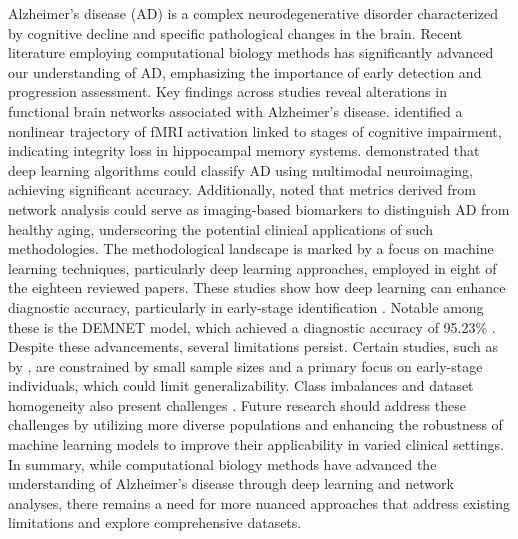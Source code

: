 \documentclass{MITcsail}
\begin{document}
Alzheimer's disease (AD) is a complex neurodegenerative disorder characterized by cognitive decline and specific pathological changes in the brain. Recent literature employing computational biology methods has significantly advanced our understanding of AD, emphasizing the importance of early detection and progression assessment. Key findings across studies reveal alterations in functional brain networks associated with Alzheimer's disease. \citet{ref_10_1523_jneurosci_2250_06_2006} identified a nonlinear trajectory of fMRI activation linked to stages of cognitive impairment, indicating integrity loss in hippocampal memory systems. \citet{ref_10_3389_fnagi_2019_00220} demonstrated that deep learning algorithms could classify AD using multimodal neuroimaging, achieving significant accuracy. Additionally, \citet{ref_10_1371_journal_pcbi_1000100} noted that metrics derived from network analysis could serve as imaging-based biomarkers to distinguish AD from healthy aging, underscoring the potential clinical applications of such methodologies. The methodological landscape is marked by a focus on machine learning techniques, particularly deep learning approaches, employed in eight of the eighteen reviewed papers. These studies show how deep learning can enhance diagnostic accuracy, particularly in early-stage identification \citep{ref_10_1109_isbi_2014_6868045,ref_10_1109_access_2021_3090474}. Notable among these is the DEMNET model, which achieved a diagnostic accuracy of 95.23\% \citep{ref_10_1109_access_2021_3090474}. Despite these advancements, several limitations persist. Certain studies, such as by \citet{ref_10_1523_jneurosci_2250_06_2006}, are constrained by small sample sizes and a primary focus on early-stage individuals, which could limit generalizability. Class imbalances and dataset homogeneity also present challenges \citep{ref_10_1186_1471_2202_10_101,ref_10_1002_alz_13390}. Future research should address these challenges by utilizing more diverse populations and enhancing the robustness of machine learning models to improve their applicability in varied clinical settings. In summary, while computational biology methods have advanced the understanding of Alzheimer's disease through deep learning and network analyses, there remains a need for more nuanced approaches that address existing limitations and explore comprehensive datasets.
\end{document}

